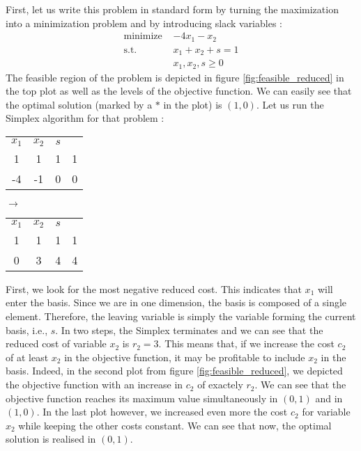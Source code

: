 First, let us write this problem in standard form by turning the maximization into a minimization problem and by introducing slack variables :
\begin{align*}
    \textrm{minimize } & -4x_1 - x_2\\
    \textrm{s.t. } & x_1 + x_2 + s = 1\\
    & x_1, x_2, s\ge 0
\end{align*} The feasible region of the problem is depicted in figure \ref{fig:feasible_reduced} in the top plot as well as the levels of the objective function. We can easily see that the optimal solution (marked by a $*$ in the plot) is $(1,0)$. Let us run the Simplex algorithm for that problem :
\begin{center}
    \begin{tabular}{ccc|c}
        $x_1$ & $x_2$ & $s$ \\
        1 & 1 & 1 & 1\\\hline
        -4 & -1 & 0 & 0
    \end{tabular}
    $\rightarrow$
    \begin{tabular}{ccc|c}
        $x_1$ & $x_2$ & $s$ \\
        1 & 1 & 1 & 1\\\hline
        0 & 3 & 4 & 4
    \end{tabular}
\end{center}
First, we look for the most negative reduced cost. This indicates that $x_1$ will enter the basis. Since we are in one dimension, the basis is composed of a single element. Therefore, the leaving variable is simply the variable forming the current basis, i.e., $s$. In two steps, the Simplex terminates and we can see that the reduced cost of variable $x_2$ is $r_2 = 3$. This means that, if we increase the cost $c_2$ of at least $x_2$ in the objective function, it may be profitable to include $x_2$ in the basis. Indeed, in the second plot from figure \ref{fig:feasible_reduced}, we depicted the objective function with an increase in $c_2$ of exactely $r_2$. We can see that the objective function reaches its maximum value simultaneously in $(0,1)$ and in $(1,0)$. In the last plot however, we increased even more the cost $c_2$ for variable $x_2$ while keeping the other costs constant. We can see that now, the optimal solution is realised in $(0,1)$.

